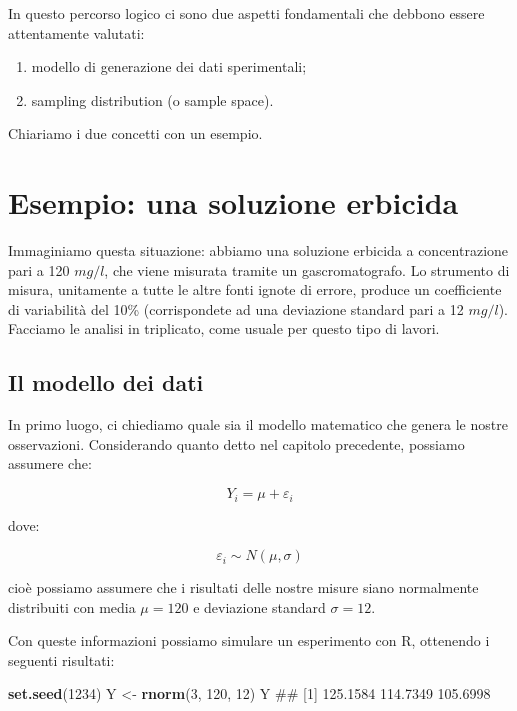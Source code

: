 \documentclass[a4paper,12pt,oneside]{book}
\providecommand{\tightlist}{%
  \setlength{\itemsep}{0pt}\setlength{\parskip}{0pt}}
\newenvironment{Shaded}{\begin{snugshade}}{\end{snugshade}}
\newcommand{\KeywordTok}[1]{\textcolor[rgb]{0.13,0.29,0.53}{\textbf{#1}}}
\newcommand{\DecValTok}[1]{\textcolor[rgb]{0.00,0.00,0.81}{#1}}
\newcommand{\StringTok}[1]{\textcolor[rgb]{0.31,0.60,0.02}{#1}}
\newcommand{\NormalTok}[1]{#1}
\theoremstyle{definition}
\theoremstyle{definition}
\theoremstyle{definition}
\theoremstyle{remark}
\begin{document}
In questo percorso logico ci sono due aspetti fondamentali che debbono
essere attentamente valutati:

\begin{enumerate}
\def\labelenumi{\arabic{enumi}.}
\tightlist
\item
  modello di generazione dei dati sperimentali;
\item
  sampling distribution (o sample space).
\end{enumerate}

Chiariamo i due concetti con un esempio.

\section{Esempio: una soluzione
erbicida}\label{esempio-una-soluzione-erbicida}

Immaginiamo questa situazione: abbiamo una soluzione erbicida a
concentrazione pari a 120 \(mg/l\), che viene misurata tramite un
gascromatografo. Lo strumento di misura, unitamente a tutte le altre
fonti ignote di errore, produce un coefficiente di variabilità del 10\%
(corrispondete ad una deviazione standard pari a 12 \(mg/l\)). Facciamo
le analisi in triplicato, come usuale per questo tipo di lavori.

\subsection{Il modello dei dati}\label{il-modello-dei-dati}

In primo luogo, ci chiediamo quale sia il modello matematico che genera
le nostre osservazioni. Considerando quanto detto nel capitolo
precedente, possiamo assumere che:

\[ Y_i = \mu + \varepsilon_i\]

dove:

\[ \varepsilon_i \sim N(\mu, \sigma)\]

cioè possiamo assumere che i risultati delle nostre misure siano
normalmente distribuiti con media \(\mu = 120\) e deviazione standard
\(\sigma = 12\).

Con queste informazioni possiamo simulare un esperimento con R,
ottenendo i seguenti risultati:

\begin{Shaded}
\begin{Highlighting}[]
\KeywordTok{set.seed}\NormalTok{(}\DecValTok{1234}\NormalTok{)}
\NormalTok{Y <-}\StringTok{ }\KeywordTok{rnorm}\NormalTok{(}\DecValTok{3}\NormalTok{, }\DecValTok{120}\NormalTok{, }\DecValTok{12}\NormalTok{)}
\NormalTok{Y}
\NormalTok{## [1] 125.1584 114.7349 105.6998}
\end{Highlighting}
\end{Shaded}
\end{document}
